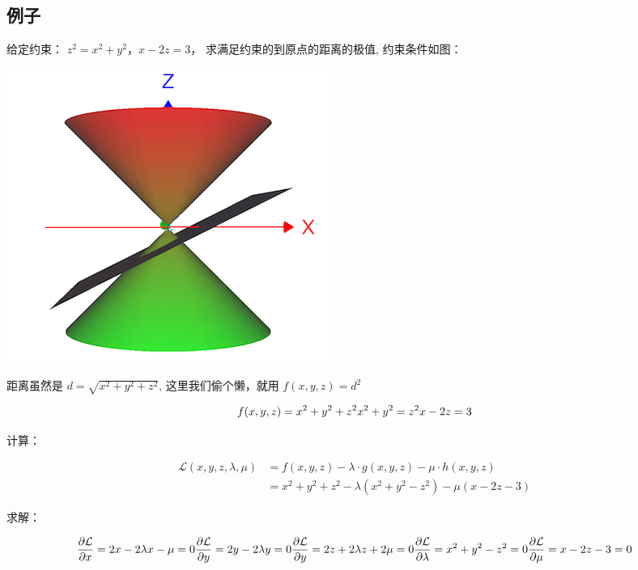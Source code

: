 \documentclass[
]{book}
\begin{document}
\hypertarget{ux4f8bux5b50-2}{%
\subsection{例子}\label{ux4f8bux5b50-2}}

给定约束： \(z^2 = x^2 + y^2 ， x - 2z = 3\)， 求满足约束的到原点的距离的极值, 约束条件如图：

\includegraphics{images/Lagrange_03.png}

距离虽然是 \(d = \sqrt{x^2 + y^2 + z^2}\), 这里我们偷个懒，就用 \(f(x,y,z) = d^2\)

\[
f(x,y, z) = x^2 + y^2 + z^2 \\
x^2 + y^2 = z^2 \\
x - 2z = 3 \\
\]

计算：

\[{\displaystyle {\begin{aligned}{\mathcal {L}}(x,y,z,\lambda, \mu )&=f(x,y,z) - \lambda \cdot g(x,y,z) - \mu \cdot h(x,y,z) \\[4pt]&= x^2 + y^2 + z^2  - \lambda (x^2 + y^2 - z^2 ) - \mu(x - 2z -3) \end{aligned}}}\]

求解：

\[
\frac{\partial \mathcal{L}}{\partial x} = 2x -  2\lambda x - \mu = 0 \\
\frac{\partial \mathcal{L}}{\partial y} = 2y -  2\lambda y = 0 \\
\frac{\partial \mathcal{L}}{\partial y} = 2z +  2 \lambda z + 2\mu= 0 \\
\frac{\partial \mathcal{L}}{\partial \lambda} = x^2 + y^2 - z^2 = 0 \\
\frac{\partial \mathcal{L}}{\partial \mu} =  x - 2z -3  = 0
\]
\end{document}
